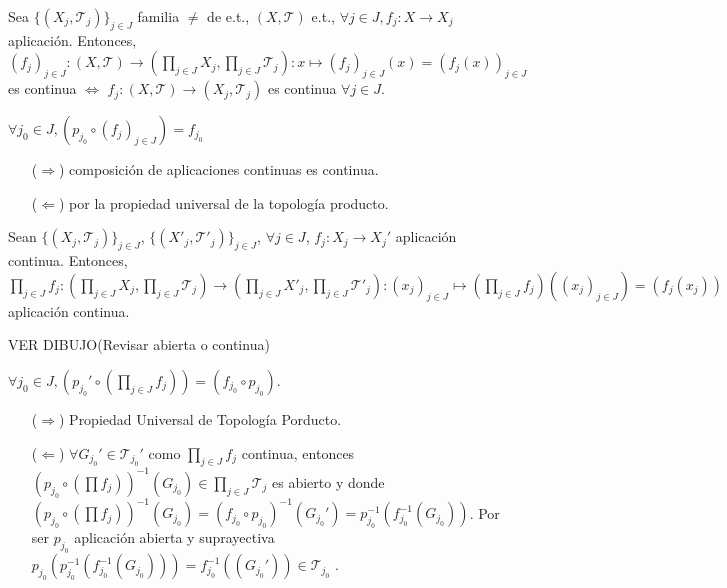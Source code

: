 \begin{prop}
  Sea $\{ ( X_{j}, \mathcal{T}_{j} ) \}_{j \in J}$ familia $\neq$ de e.t., $( X, \mathcal{T} )$ e.t., $\forall j \in J, f_{j}: X \to X_{j}$ aplicación. Entonces, $( f_{j} )_{j \in J}: ( X, \mathcal{T} ) \to ( \prod_{j \in J} X_{j}, \prod_{j \in J} \mathcal{T}_{j} ) : x \mapsto ( f_{j} )_{j \in J}(x) = ( f_{j}(x) )_{j \in J}$ es continua $\Leftrightarrow$ $f_{j}: ( X, \mathcal{T} ) \to ( X_{j}, \mathcal{T}_{j} )$  es continua $\forall j \in J$.
\end{prop}

\begin{dem}
  $\forall j_{0} \in J, (p_{j_{0}} \circ ( f_{j} )_{j \in J}) = f_{j_{0}}$
  \begin{enumerate}[label=(\roman*)]
    \item [($\Rightarrow$)]  composición de aplicaciones continuas es continua.
    \item [($\Leftarrow$)] por la propiedad universal de la topología producto.
  \end{enumerate}
\end{dem}

\begin{prop}
  Sean $\{ ( X_{j}, \mathcal{T}_{j} ) \}_{j \in J}$, $\{ ( X'_{j}, \mathcal{T'}_{j} ) \}_{j \in J}$, $\forall j \in J$, $f_{j}: X_{j} \to X_{j}'$ aplicación continua. Entonces, $\prod_{j \in J} f_{j}: ( \prod_{j \in J} X_{j}, \prod_{j \in J} \mathcal{T}_{j} ) \to ( \prod_{j \in J} X'_{j}, \prod_{j \in J} \mathcal{T'}_{j} ): ( x_{j} )_{j \in J} \mapsto (\prod_{j \in J} f_{j})(( x_{j} )_{j \in J}) = (f_{j}(x_{j}))$ aplicación continua.
\end{prop}

VER DIBUJO(Revisar abierta o continua)

\begin{dem}
  $\forall j_{0} \in J, (p_{j_{0}}' \circ (\prod_{j \in J} f_{j})) = (f_{j_{0}} \circ p_{j_{0}})$.
  \begin{enumerate}[label=(\roman*)]
    \item [($\Rightarrow$)] Propiedad Universal de Topología Porducto.
    \item [($\Leftarrow$)] $\forall G_{j_{0}}' \in \mathcal{T}_{j_{0}}'$ como $\prod_{j \in J} f_{j}$ continua, entonces $(p_{j_{0}} \circ (\prod f_{j}))^{-1}(G_{j_{0}}) \in \prod_{j \in J} \mathcal{T}_{j}$ es abierto y donde $(p_{j_{0}} \circ (\prod f_{j}))^{-1}(G_{j_{0}}) = (f_{j_{0}} \circ p_{j_{0}})^{-1}(G_{j_{0}}') = p_{j_{0}}^{-1}(f_{j_{0}}^{-1}(G_{j_{0}}))$. Por ser $p_{j_{0}}$ aplicación abierta y suprayectiva $p_{j_{0}}(p_{j_{0}}^{-1}(f_{j_{0}}^{-1}(G_{j_{0}}))) = f_{j_{0}}^{-1}((G_{j_{0}}')) \in \mathcal{T}_{j_{0}}$ .
  \end{enumerate}
\end{dem}

